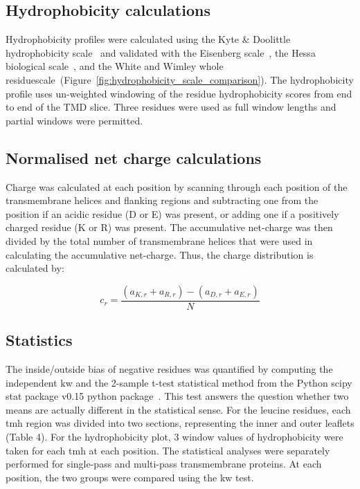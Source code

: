 \subsection{Hydrophobicity calculations}

Hydrophobicity profiles were calculated using the Kyte \& Doolittle hydrophobicity scale~\cite{Kyte1982} and validated with the Eisenberg scale~\cite{Eisenberg1984}, the Hessa biological scale~\cite{Hessa2005}, and the White and Wimley whole residuescale~\cite{White1999}(Figure~\ref{fig:hydrophobicity_scale_comparison}). The hydrophobicity profile uses un-weighted windowing of the residue hydrophobicity scores from end to end of the TMD slice. Three residues were used as full window lengths and partial windows were permitted.

\subsection{Normalised net charge calculations}

Charge was calculated at each position by scanning through each position of the transmembrane helices and flanking regions and subtracting one from the position if an acidic residue (D or E) was present, or adding one if a positively charged residue (K or R) was present. The accumulative net-charge  was then divided by the total number  of transmembrane helices that were used in calculating the accumulative net-charge. Thus, the charge distribution is calculated by:

\begin{equation} \label{eq:charge_equation}
c_r=\frac{(a_{K,r}+a_{R,r})-(a_{D,r}+a_{E,r})}{N}
\end{equation}

\subsection{Statistics}

The inside/outside bias of negative residues was quantified by computing the independent \gls{kw} and the 2-sample t-test statistical method from the Python scipy stat package v0.15 python package~\cite{VanderWalt2011}. This test answers the question whether two means are actually different in the statistical sense. For the leucine residues, each \gls{tmh} region was divided into two sections, representing the inner and outer leaflets (Table 4).  For the hydrophobicity plot, 3 window values of hydrophobicity were taken for each \gls{tmh} at each position. The statistical analyses were separately performed for single-pass and multi-pass transmembrane proteins. At each position, the two groups were compared using the \gls{kw} test.


